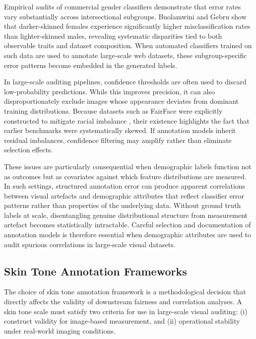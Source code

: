 Empirical audits of commercial gender classifiers demonstrate that error rates vary substantially across intersectional subgroups. Buolamwini and Gebru \cite{Buolamwini_2018_GenderShades} show that darker-skinned females experience significantly higher misclassification rates than lighter-skinned males, revealing systematic disparities tied to both observable traits and dataset composition. When automated classifiers trained on such data are used to annotate large-scale web datasets, these subgroup-specific error patterns become embedded in the generated labels.

In large-scale auditing pipelines, confidence thresholds are often used to discard low-probability predictions. While this improves precision, it can also disproportionately exclude images whose appearance deviates from dominant training distributions. Because datasets such as FairFace were explicitly constructed to mitigate racial imbalance \cite{Karkkainen_2021_FairFace}, their existence highlights the fact that earlier benchmarks were systematically skewed. If annotation models inherit residual imbalances, confidence filtering may amplify rather than eliminate selection effects.

These issues are particularly consequential when demographic labels function not as outcomes but as covariates against which feature distributions are measured. In such settings, structured annotation error can produce apparent correlations between visual artefacts and demographic attributes that reflect classifier error patterns rather than properties of the underlying data. Without ground truth labels at scale, disentangling genuine distributional structure from measurement artefact becomes statistically intractable. Careful selection and documentation of annotation models is therefore essential when demographic attributes are used to audit spurious correlations in large-scale visual datasets.

\subsection{Skin Tone Annotation Frameworks}

The choice of skin tone annotation framework is a methodological decision that directly affects the validity of downstream fairness and correlation analyses. A skin tone scale must satisfy two criteria for use in large-scale visual auditing: (i) construct validity for image-based measurement, and (ii) operational stability under real-world imaging conditions.

